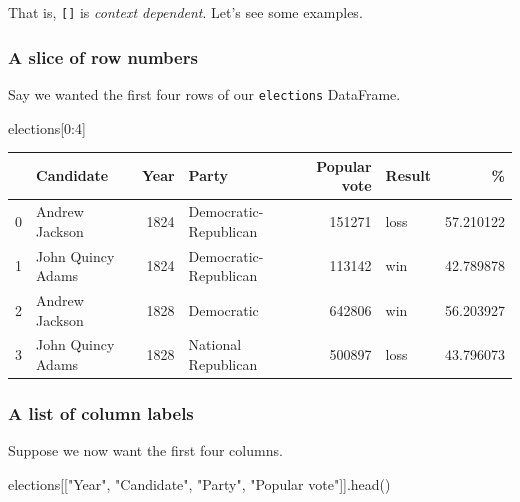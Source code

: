 \documentclass[
  letterpaper,
  DIV=11,
  numbers=noendperiod]{scrreprt}
\newenvironment{Shaded}{\begin{snugshade}}{\end{snugshade}}
\newcommand{\DecValTok}[1]{\textcolor[rgb]{0.68,0.00,0.00}{#1}}
\newcommand{\NormalTok}[1]{\textcolor[rgb]{0.00,0.23,0.31}{#1}}
\newcommand{\StringTok}[1]{\textcolor[rgb]{0.13,0.47,0.30}{#1}}
\begin{document}
That is, \texttt{{[}{]}} is \emph{context dependent}. Let's see some
examples.

\hypertarget{a-slice-of-row-numbers}{%
\subsubsection{A slice of row numbers}\label{a-slice-of-row-numbers}}

Say we wanted the first four rows of our \texttt{elections} DataFrame.

\begin{Shaded}
\begin{Highlighting}[]
\NormalTok{elections[}\DecValTok{0}\NormalTok{:}\DecValTok{4}\NormalTok{]}
\end{Highlighting}
\end{Shaded}

\begin{tabular}{llrlrlr}
\toprule
{} &          Candidate &  Year &                  Party &  Popular vote & Result &          \% \\
\midrule
0 &     Andrew Jackson &  1824 &  Democratic-Republican &        151271 &   loss &  57.210122 \\
1 &  John Quincy Adams &  1824 &  Democratic-Republican &        113142 &    win &  42.789878 \\
2 &     Andrew Jackson &  1828 &             Democratic &        642806 &    win &  56.203927 \\
3 &  John Quincy Adams &  1828 &    National Republican &        500897 &   loss &  43.796073 \\
\bottomrule
\end{tabular}

\hypertarget{a-list-of-column-labels}{%
\subsubsection{A list of column labels}\label{a-list-of-column-labels}}

Suppose we now want the first four columns.

\begin{Shaded}
\begin{Highlighting}[]
\NormalTok{elections[[}\StringTok{"Year"}\NormalTok{, }\StringTok{"Candidate"}\NormalTok{, }\StringTok{"Party"}\NormalTok{, }\StringTok{"Popular vote"}\NormalTok{]].head()}
\end{Highlighting}
\end{Shaded}
\end{document}
